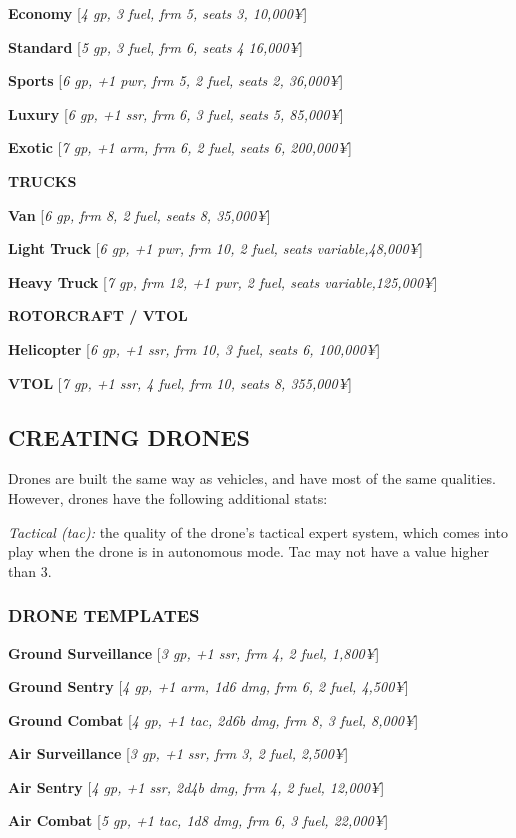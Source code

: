 \documentclass[oneside,10pt]{article}
\begin{document}
\begin{multicols}{2}
\textbf{Economy} [\textit{4 gp, 3 fuel, frm 5, seats 3, 10,000¥}]

\textbf{Standard} [\textit{5 gp, 3 fuel, frm 6, seats 4 16,000¥}]

\textbf{Sports} [\textit{6 gp, +1 pwr, frm 5, 2 fuel, seats 2, 36,000¥}]

\textbf{Luxury} [\textit{6 gp, +1 ssr, frm 6, 3 fuel, seats 5, 85,000¥}]

\textbf{Exotic} [\textit{7 gp, +1 arm, frm 6, 2 fuel, seats 6, 200,000¥}]

\textbf{TRUCKS}

\textbf{Van} [\textit{6 gp, frm 8, 2 fuel, seats 8, 35,000¥}]

\textbf{Light Truck} [\textit{6 gp, +1 pwr, frm 10, 2 fuel, seats variable,48,000¥}]

\textbf{Heavy Truck} [\textit{7 gp, frm 12, +1 pwr, 2 fuel, seats variable,125,000¥}]

\textbf{ROTORCRAFT / VTOL}

\textbf{Helicopter} [\textit{6 gp, +1 ssr, frm 10, 3 fuel, seats 6, 100,000¥}]

\textbf{VTOL} [\textit{7 gp, +1 ssr, 4 fuel, frm 10, seats 8, 355,000¥}]

\subsection{CREATING DRONES}
Drones are built the same way as vehicles, and have most
of the same qualities. However, drones have the following
additional stats:

\begin{dent}
\textit{Tactical (tac):} the quality of the drone’s tactical expert system, which comes into play when the drone is in autonomous mode. Tac may not have a value higher than 3.
\end{dent}

\subsubsection{DRONE TEMPLATES}
\textbf{Ground Surveillance} [\textit{3 gp, +1 ssr, frm 4, 2 fuel, 1,800¥}]

\textbf{Ground Sentry} [\textit{4 gp, +1 arm, 1d6 dmg, frm 6, 2 fuel, 4,500¥}]

\textbf{Ground Combat} [\textit{4 gp, +1 tac, 2d6b dmg, frm 8, 3 fuel, 8,000¥}]

\textbf{Air Surveillance} [\textit{3 gp, +1 ssr, frm 3, 2 fuel, 2,500¥}]

\textbf{Air Sentry} [\textit{4 gp, +1 ssr, 2d4b dmg, frm 4, 2 fuel, 12,000¥}]

\textbf{Air Combat} [\textit{5 gp, +1 tac, 1d8 dmg, frm 6, 3 fuel, 22,000¥}]

\end{multicols}
\end{document}

